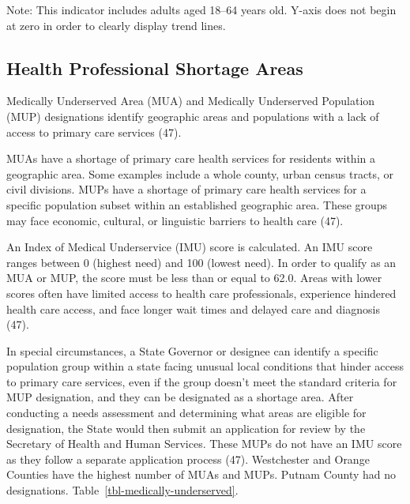\documentclass[
  english,
  letterpaper,
]{report}
\begin{document}
\begin{tcolorbox}[enhanced jigsaw, breakable, leftrule=.75mm, title=\textcolor{quarto-callout-note-color}{\faInfo}\hspace{0.5em}{Note}, bottomrule=.15mm, opacityback=0, left=2mm, colback=white, bottomtitle=1mm, coltitle=black, colbacktitle=quarto-callout-note-color!10!white, colframe=quarto-callout-note-color-frame, opacitybacktitle=0.6, toptitle=1mm, titlerule=0mm, arc=.35mm, rightrule=.15mm, toprule=.15mm]

Note: This indicator includes adults aged 18--64 years old. Y-axis does
not begin at zero in order to clearly display trend lines.

\end{tcolorbox}

\subsection{Health Professional Shortage
Areas}\label{health-professional-shortage-areas}

Medically Underserved Area (MUA) and Medically Underserved Population
(MUP) designations identify geographic areas and populations with a lack
of access to primary care services (47).

MUAs have a shortage of primary care health services for residents
within a geographic area. Some examples include a whole county, urban
census tracts, or civil divisions. MUPs have a shortage of primary care
health services for a specific population subset within an established
geographic area. These groups may face economic, cultural, or linguistic
barriers to health care (47).

An Index of Medical Underservice (IMU) score is calculated. An IMU score
ranges between 0 (highest need) and 100 (lowest need). In order to
qualify as an MUA or MUP, the score must be less than or equal to 62.0.
Areas with lower scores often have limited access to health care
professionals, experience hindered health care access, and face longer
wait times and delayed care and diagnosis (47).

In special circumstances, a State Governor or designee can identify a
specific population group within a state facing unusual local conditions
that hinder access to primary care services, even if the group doesn't
meet the standard criteria for MUP designation, and they can be
designated as a shortage area. After conducting a needs assessment and
determining what areas are eligible for designation, the State would
then submit an application for review by the Secretary of Health and
Human Services. These MUPs do not have an IMU score as they follow a
separate application process (47). Westchester and Orange Counties have
the highest number of MUAs and MUPs. Putnam County had no designations.
Table~\ref{tbl-medically-underserved}.
\end{document}
